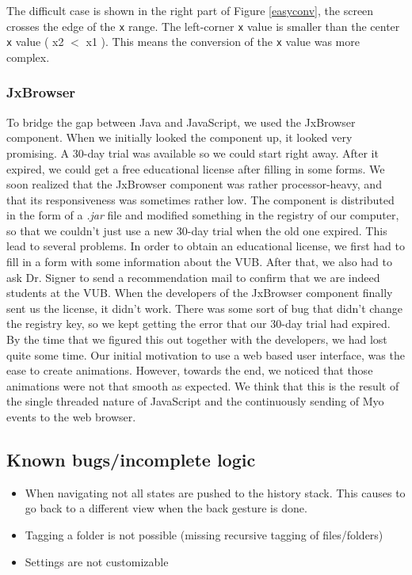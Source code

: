 \documentclass{article}
\begin{document}
The difficult case is shown in the right part of Figure \ref{easyconv}, the screen crosses the edge of the \texttt{x} range. The left-corner \texttt{x} value is smaller than the center \texttt{x} value ( x2 $<$ x1 ). This means the conversion of the \texttt{x} value was more complex.

\subsubsection{JxBrowser}
To bridge the gap between Java and JavaScript, we used the JxBrowser component. When we initially looked the component up, it looked very promising. A 30-day trial was available so we could start right away. After it expired, we could get a free educational license after filling in some forms. We soon realized that the JxBrowser component was rather processor-heavy, and that its responsiveness was sometimes rather low. The component is distributed in the form of a \textit{.jar} file and modified something in the registry of our computer, so that we couldn't just use a new 30-day trial when the old one expired. This lead to several problems. In order to obtain an educational license, we first had to fill in a form with some information about the VUB. After that, we also had to ask Dr. Signer to send a recommendation mail to confirm that we are indeed students at the VUB. When the developers of the JxBrowser component finally sent us the license, it didn't work. There was some sort of bug that didn't change the registry key, so we kept getting the error that our 30-day trial had expired. By the time that we figured this out together with the developers, we had lost quite some time.
Our initial motivation to use a web based user interface, was the ease to create animations. However, towards the end, we noticed that those animations were not that smooth as expected. We think that this is the result of the single threaded nature of JavaScript and the continuously sending of Myo events to the web browser.

\subsection{Known bugs/incomplete logic}
\begin{itemize}
\item When navigating not all states are pushed to the history stack. This causes to go back to a different view when the back gesture is done.
\item Tagging a folder is not possible (missing recursive tagging of files/folders)
\item Settings are not customizable
\end{itemize}
\end{document}
